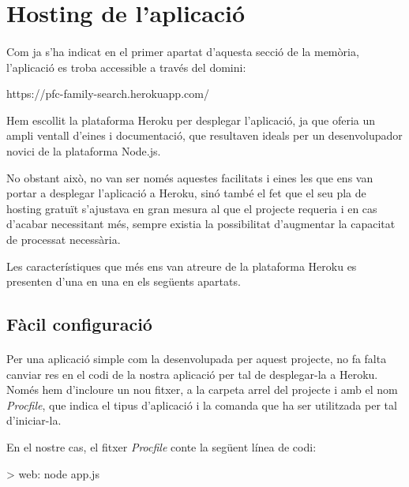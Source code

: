 \section{Hosting de l'aplicació}

    \paragraph{}
    Com ja s'ha indicat en el primer apartat d'aquesta secció de la memòria, l'aplicació es troba accessible a través del domini:

    \begin{displayquote}
        https://pfc-family-search.herokuapp.com/
    \end{displayquote}

    Hem escollit la plataforma Heroku per desplegar l'aplicació, ja que oferia un ampli ventall d'eines i documentació, que resultaven ideals per un desenvolupador novici de la plataforma Node.js.

    No obstant això, no van ser només aquestes facilitats i eines les que ens van portar a desplegar l'aplicació a Heroku, sinó també el fet que el seu pla de hosting gratuït s'ajustava en gran mesura al que el projecte requeria i en cas d'acabar necessitant més, sempre existia la possibilitat d'augmentar la capacitat de processat necessària.

    Les característiques que més ens van atreure de la plataforma Heroku es presenten d'una en una en els següents apartats.

    \subsection{Fàcil configuració}

    \paragraph{}
    Per una aplicació simple com la desenvolupada per aquest projecte, no fa falta canviar res en el codi de la nostra aplicació per tal de desplegar-la a Heroku. Només hem d'incloure un nou fitxer, a la carpeta arrel del projecte i amb el nom \emph{Procfile}, que indica el tipus d'aplicació i la comanda que ha ser utilitzada per tal d'iniciar-la.

    En el nostre cas, el fitxer \emph{Procfile} conte la següent línea de codi:

    \begin{displayquote}
        > web: node app.js
    \end{displayquote}


